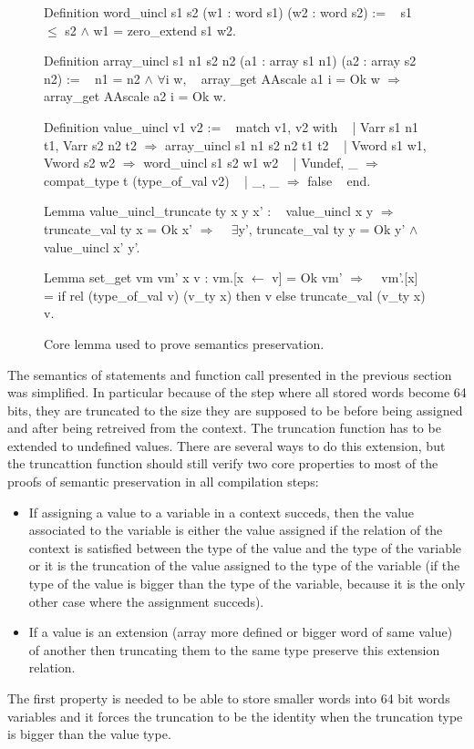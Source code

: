 \documentclass{article}
\begin{document}
\medskip

\begin{figure}[t]
\obeylines\obeyspaces\ttfamily%
Definition word\_uincl s1 s2 (w1 : word s1) (w2 : word s2) :=
~ s1 \(\leq\) s2 \(\wedge\) w1 = zero\_extend s1 w2.

Definition array\_uincl s1 n1 s2 n2 (a1 : array s1 n1) (a2 : array s2 n2) :=
~ n1 = n2 \(\wedge\) \(\forall\)i w,
~   array\_get AAscale a1 i = Ok w \(\Longrightarrow\) array\_get AAscale a2 i = Ok w.

Definition value\_uincl v1 v2 :=
~ match v1, v2 with
~ | Varr s1 n1 t1, Varr s2 n2 t2 \(\Rightarrow\) array\_uincl s1 n1 s2 n2 t1 t2
~ | Vword s1 w1,   Vword s2 w2   \(\Rightarrow\) word\_uincl s1 s2 w1 w2
~ | Vundef,        \_             \(\Rightarrow\) compat\_type t (type\_of\_val v2)
~ | \_,             \_             \(\Rightarrow\) false
~ end.

Lemma value\_uincl\_truncate ty x y x' :
~ value\_uincl x y \(\Longrightarrow\) truncate\_val ty x = Ok x' \(\Longrightarrow\)
~ \(\exists\)y', truncate\_val ty y = Ok y' \(\wedge\) value\_uincl x' y'.

Lemma set\_get vm vm' x v : vm.[x \(\leftarrow\) v] = Ok vm' \(\Longrightarrow\)
~ vm'.[x] = if rel (type\_of\_val v) (v\_ty x) then v else truncate\_val (v\_ty x) v.
\normalfont%
\caption{Core lemma used to prove semantics preservation.}
\end{figure}

The semantics of statements and function call presented in the previous section
was simplified. In particular because of the step where all stored words become
64 bits, they are truncated to the size they are supposed to be before being
assigned and after being retreived from the context. The truncation function
has to be extended to undefined values. There are several ways to do this
extension, but the truncattion function should still verify two core properties
to most of the proofs of semantic preservation in all compilation steps:
\begin{itemize}
\item If assigning a value to a variable in a context succeds, then the value
  associated to the variable is either the value assigned if the relation of the
  context is satisfied between the type of the value and the type of the
  variable or it is the truncation of the value assigned to the type of the
  variable (if the type of the value is bigger than the type of the variable,
  because it is the only other case where the assignment succeds).
\item If a value is an extension (array more defined or bigger word of same
  value) of another then truncating them to the same type preserve this
  extension relation.
\end{itemize}
The first property is needed to be able to store smaller words into 64 bit words
variables and it forces the truncation to be the identity when the truncation
type is bigger than the value type.
\end{document}
